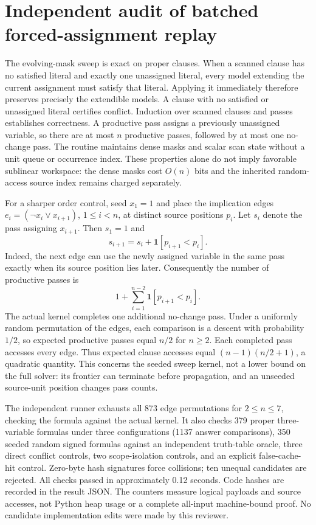 \section{Independent audit of batched forced-assignment replay}
The evolving-mask sweep is exact on proper clauses. When a scanned clause has no satisfied literal and exactly one unassigned literal, every model extending the current assignment must satisfy that literal. Applying it immediately therefore preserves precisely the extendible models. A clause with no satisfied or unassigned literal certifies conflict. Induction over scanned clauses and passes establishes correctness. A productive pass assigns a previously unassigned variable, so there are at most $n$ productive passes, followed by at most one no-change pass. The routine maintains dense masks and scalar scan state without a unit queue or occurrence index. These properties alone do not imply favorable sublinear workspace: the dense masks cost $O(n)$ bits and the inherited random-access source index remains charged separately.

For a sharper order control, seed $x_1=1$ and place the implication edges $e_i=(\neg x_i\lor x_{i+1})$, $1\leq i<n$, at distinct source positions $p_i$. Let $s_i$ denote the pass assigning $x_{i+1}$. Then $s_1=1$ and
\[
 s_{i+1}=s_i+\mathbf 1[p_{i+1}<p_i].
\]
Indeed, the next edge can use the newly assigned variable in the same pass exactly when its source position lies later. Consequently the number of productive passes is
\[
 1+\sum_{i=1}^{n-2}\mathbf 1[p_{i+1}<p_i].
\]
The actual kernel completes one additional no-change pass. Under a uniformly random permutation of the edges, each comparison is a descent with probability $1/2$, so expected productive passes equal $n/2$ for $n\geq2$. Each completed pass accesses every edge. Thus expected clause accesses equal $(n-1)(n/2+1)$, a quadratic quantity. This concerns the seeded sweep kernel, not a lower bound on the full solver: its frontier can terminate before propagation, and an unseeded source-unit position changes pass counts.

The independent runner exhausts all 873 edge permutations for $2\leq n\leq7$, checking the formula against the actual kernel. It also checks 379 proper three-variable formulas under three configurations (1137 answer comparisons), 350 seeded random signed formulas against an independent truth-table oracle, three direct conflict controls, two scope-isolation controls, and an explicit false-cache-hit control. Zero-byte hash signatures force collisions; ten unequal candidates are rejected. All checks passed in approximately 0.12 seconds. Code hashes are recorded in the result JSON. The counters measure logical payloads and source accesses, not Python heap usage or a complete all-input machine-bound proof. No candidate implementation edits were made by this reviewer.
